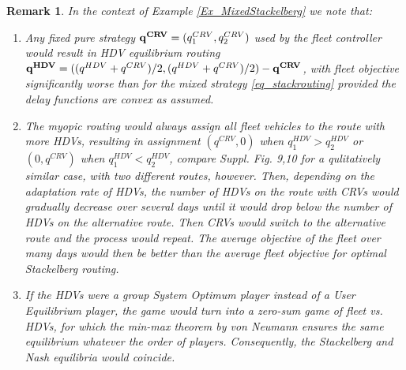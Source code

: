 \documentclass[a4paper,11pt]{article}
\newtheorem{remark}[theorem]{Remark}
\begin{document}
\begin{remark}
\label{Rem_context}
In the context of Example \ref{Ex_MixedStackelberg} we note that: 
\begin{enumerate}
\item[i)] Any fixed pure strategy $\bold{q^{CRV}}=(q^{CRV}_1, q^{CRV}_2)$ used by the fleet controller would result in HDV equilibrium routing $\bold{q^{HDV}} = ((q^{HDV}+q^{CRV})/2, (q^{HDV}+q^{CRV})/2) - \bold{q^{CRV}}$, with fleet objective significantly worse than for the mixed strategy \eqref{eq_stackrouting} provided the delay functions are convex as assumed. 
\item[ii)] The myopic routing would always assign all fleet vehicles to the route with more HDVs, resulting in assignment $(q^{CRV}, 0)$ when ${q^{HDV}_1} > {q^{HDV}_2}$ or $(0,q^{CRV})$ when $q_1^{HDV} < {q_2^{HDV}}$, compare \cite{JamrozSciRep} Suppl. Fig. 9,10 for a qulitatively similar case, with two \emph{different} routes, however. Then, depending on the adaptation rate of HDVs, the number of HDVs on the route with CRVs would gradually decrease over several days until it would drop below the number of HDVs on the alternative route. Then CRVs would switch to the alternative route and the process would repeat. The average objective of the fleet over many days would then be better than the average fleet objective for optimal Stackelberg routing.  

   
\item[iii)] If the HDVs were a group \emph{System Optimum} player instead of a User Equilibrium player, the game would turn into a zero-sum game of fleet vs. HDVs, for which the min-max theorem by von Neumann \cite{vonNeumann} ensures the same equilibrium whatever the order of players. Consequently, the Stackelberg and Nash equilibria would coincide. 
\end{enumerate}
\end{remark}

\end{document}
